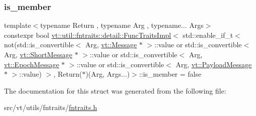 \subsubsection{\texorpdfstring{is\+\_\+member}{is\_member}}
{\footnotesize\ttfamily template$<$typename Return , typename Arg , typename... Args$>$ \\
constexpr bool \hyperlink{structvt_1_1util_1_1fntraits_1_1detail_1_1_func_traits_impl}{vt\+::util\+::fntraits\+::detail\+::\+Func\+Traits\+Impl}$<$ std\+::enable\+\_\+if\+\_\+t$<$ not(std\+::is\+\_\+convertible$<$ Arg, \hyperlink{namespacevt_a3a3ddfef40b4c90915fa43cdd5f129ea}{vt\+::\+Message} $\ast$ $>$\+::value or std\+::is\+\_\+convertible$<$ Arg, \hyperlink{namespacevt_a1125ac1da6c0bbf141e0ea0739d7602d}{vt\+::\+Short\+Message} $\ast$ $>$\+::value or std\+::is\+\_\+convertible$<$ Arg, \hyperlink{namespacevt_ad67368ffae52d7325002586b41bb150e}{vt\+::\+Epoch\+Message} $\ast$ $>$\+::value or std\+::is\+\_\+convertible$<$ Arg, \hyperlink{namespacevt_a89a92229c5622b855c02c549f83a1a68}{vt\+::\+Payload\+Message} $\ast$ $>$\+::value) $>$, Return($\ast$)(Arg, Args...)$>$\+::is\+\_\+member = false\hspace{0.3cm}{\ttfamily [static]}}



The documentation for this struct was generated from the following file\+:\begin{DoxyCompactItemize}
\item 
src/vt/utils/fntraits/\hyperlink{fntraits_8h}{fntraits.\+h}\end{DoxyCompactItemize}
